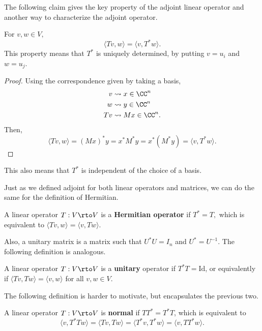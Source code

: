The following claim gives the key property of the adjoint linear operator and another way to characterize the adjoint operator.

\begin{claim}
For $v, w \in V,$
\[
\langle Tv, w \rangle = \langle v, T^*w\rangle.
\]
This property means that $T^*$ is uniquely determined, by putting $v = u_i$ and $w = u_j.$
\end{claim}

\begin{proof}
Using the correspondence given by taking a basis, 
\begin{align*}
    v &\rightsquigarrow x \in \CC^n \\
    w &\rightsquigarrow y \in \CC^n \\
    Tv &\rightsquigarrow Mx \in \CC^n.
\end{align*}
Then, 
\[
\langle Tv, w \rangle = (Mx)^*y = x^*M^*y = x^*(M^*y) = \langle v, T^*w\rangle.
\]
\end{proof}

This also means that $T^*$ is independent of the choice of a basis.

Just as we defined adjoint for both linear operators and matrices, we can do the same for the definition of Hermitian.
\begin{definition}
A linear operator $T: V \rto V$ is a \textbf{Hermitian operator} if $T^* = T,$ which is equivalent to $\langle Tv, w \rangle = \langle v, Tw \rangle.$ %
\end{definition}

Also, a unitary matrix is a matrix such that $U^*U = I_n$ and $U^* = U^{-1}.$ The following definition is analogous.
\begin{definition}
A linear operator $T: V \rto V$ is a \textbf{unitary} operator if $T^*T = \text{Id}$, or equivalently if $\langle Tv, Tw \rangle = \langle v, w \rangle$ for all $v, w \in V.$
\end{definition}

The following definition is harder to motivate, but encapsulates the previous two. 
\begin{definition}
A linear operator $T:V \rto V$ is \textbf{normal} if $T T^* = T^*T$, which is equivalent to \[\langle v, T^*Tw \rangle = \boxed{\langle Tv, Tw \rangle = \langle T^*v, T^*w \rangle} = \langle v, TT^*w \rangle.\]
\end{definition}

